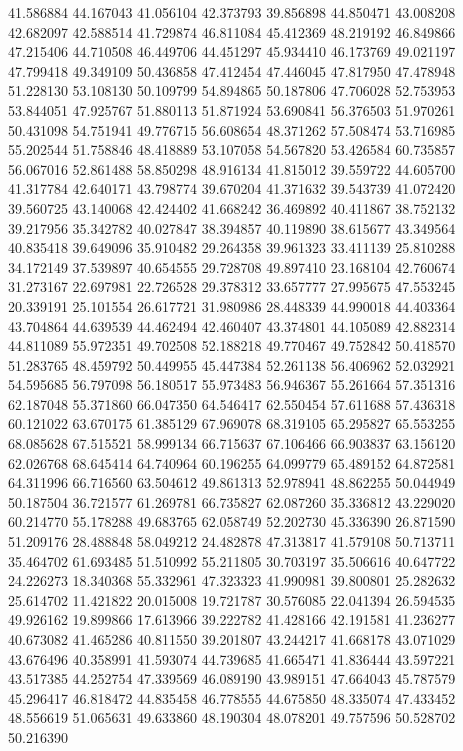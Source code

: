 41.586884
44.167043
41.056104
42.373793
39.856898
44.850471
43.008208
42.682097
42.588514
41.729874
46.811084
45.412369
48.219192
46.849866
47.215406
44.710508
46.449706
44.451297
45.934410
46.173769
49.021197
47.799418
49.349109
50.436858
47.412454
47.446045
47.817950
47.478948
51.228130
53.108130
50.109799
54.894865
50.187806
47.706028
52.753953
53.844051
47.925767
51.880113
51.871924
53.690841
56.376503
51.970261
50.431098
54.751941
49.776715
56.608654
48.371262
57.508474
53.716985
55.202544
51.758846
48.418889
53.107058
54.567820
53.426584
60.735857
56.067016
52.861488
58.850298
48.916134
41.815012
39.559722
44.605700
41.317784
42.640171
43.798774
39.670204
41.371632
39.543739
41.072420
39.560725
43.140068
42.424402
41.668242
36.469892
40.411867
38.752132
39.217956
35.342782
40.027847
38.394857
40.119890
38.615677
43.349564
40.835418
39.649096
35.910482
29.264358
39.961323
33.411139
25.810288
34.172149
37.539897
40.654555
29.728708
49.897410
23.168104
42.760674
31.273167
22.697981
22.726528
29.378312
33.657777
27.995675
47.553245
20.339191
25.101554
26.617721
31.980986
28.448339
44.990018
44.403364
43.704864
44.639539
44.462494
42.460407
43.374801
44.105089
42.882314
44.811089
55.972351
49.702508
52.188218
49.770467
49.752842
50.418570
51.283765
48.459792
50.449955
45.447384
52.261138
56.406962
52.032921
54.595685
56.797098
56.180517
55.973483
56.946367
55.261664
57.351316
62.187048
55.371860
66.047350
64.546417
62.550454
57.611688
57.436318
60.121022
63.670175
61.385129
67.969078
68.319105
65.295827
65.553255
68.085628
67.515521
58.999134
66.715637
67.106466
66.903837
63.156120
62.026768
68.645414
64.740964
60.196255
64.099779
65.489152
64.872581
64.311996
66.716560
63.504612
49.861313
52.978941
48.862255
50.044949
50.187504
36.721577
61.269781
66.735827
62.087260
35.336812
43.229020
60.214770
55.178288
49.683765
62.058749
52.202730
45.336390
26.871590
51.209176
28.488848
58.049212
24.482878
47.313817
41.579108
50.713711
35.464702
61.693485
51.510992
55.211805
30.703197
35.506616
40.647722
24.226273
18.340368
55.332961
47.323323
41.990981
39.800801
25.282632
25.614702
11.421822
20.015008
19.721787
30.576085
22.041394
26.594535
49.926162
19.899866
17.613966
39.222782
41.428166
42.191581
41.236277
40.673082
41.465286
40.811550
39.201807
43.244217
41.668178
43.071029
43.676496
40.358991
41.593074
44.739685
41.665471
41.836444
43.597221
43.517385
44.252754
47.339569
46.089190
43.989151
47.664043
45.787579
45.296417
46.818472
44.835458
46.778555
44.675850
48.335074
47.433452
48.556619
51.065631
49.633860
48.190304
48.078201
49.757596
50.528702
50.216390
